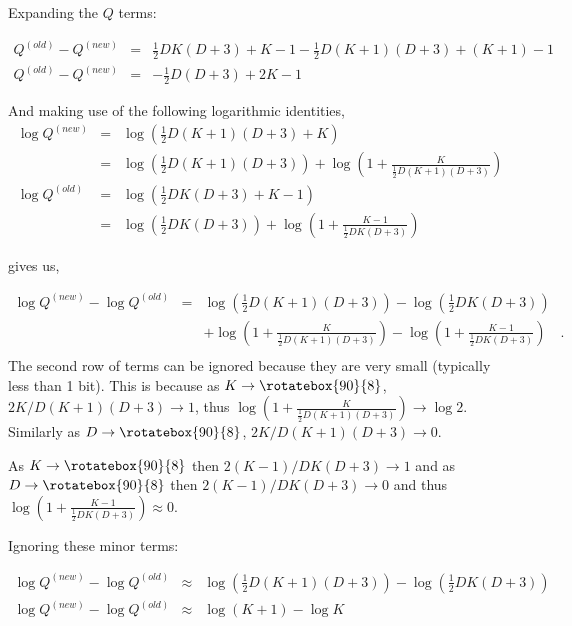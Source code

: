 \documentclass{elsarticle}
\def\infinity{\rotatebox{90}{8}}
\begin{document}
Expanding the $Q$ terms:

\begin{eqnarray}
Q^{(old)} - Q^{(new)} &=& \frac{1}{2}DK(D + 3) + K - 1 - \frac{1}{2}D(K + 1)(D + 3) + (K + 1) - 1 \nonumber \\
Q^{(old)} - Q^{(new)} &=& -\frac{1}{2}D(D+3) + 2K  - 1
\label{eq:14}
\end{eqnarray}

\noindent{}And making use of the following logarithmic identities,
\begin{eqnarray}
  \log{Q^{(new)}} &=& \log{\left(\frac{1}{2}D(K+1)(D + 3) + K\right)} \nonumber \\
                  &=& \log{\left(\frac{1}{2}D(K+1)(D + 3)\right)} + \log{\left(1 + \frac{K}{\frac{1}{2}D(K+1)(D + 3)}\right)} \\
  \log{Q^{(old)}} &=& \log{\left(\frac{1}{2}DK(D + 3) + K - 1\right)} \nonumber \\
                  &=& \log{\left(\frac{1}{2}DK(D + 3)\right)} + \log{\left(1 + \frac{K - 1}{\frac{1}{2}DK(D + 3)}\right)}
\end{eqnarray}


\noindent{}gives us,

\begin{eqnarray}
  \log{Q^{(new)}} - \log{Q^{(old)}} &=& \log{\left(\frac{1}{2}D(K+1)(D + 3)\right)} - \log{\left(\frac{1}{2}DK(D + 3)\right)} \nonumber \\
                                    &&+ \log{\left(1 + \frac{K}{\frac{1}{2}D(K+1)(D + 3)}\right)} - \log{\left(1 + \frac{K - 1}{\frac{1}{2}DK(D + 3)}\right)} \quad .\\
\end{eqnarray}
The second row of terms can be ignored because they are very small (typically less than 1 bit). This is because as $K \rightarrow \infinity$, $2K/D(K+1)(D+3) \rightarrow 1$, thus $\log{\left(1 + \frac{K}{\frac{1}{2}D(K+1)(D + 3)}\right)} \rightarrow \log{2}$. Similarly as $D \rightarrow \infinity$, $2K/D(K+1)(D+3) \rightarrow 0$.

As $K \rightarrow \infinity$ then $2(K-1)/DK(D+3) \rightarrow 1$ and as $D \rightarrow \infinity$ then $2(K-1)/DK(D+3) \rightarrow 0$ and thus $\log{\left(1 + \frac{K - 1}{\frac{1}{2}DK(D + 3)}\right)} \approx 0$.

\noindent{}Ignoring these minor terms:

\begin{eqnarray}
  \log{Q^{(new)}} - \log{Q^{(old)}} &\approx& \log{\left(\frac{1}{2}D(K+1)(D + 3)\right)} - \log{\left(\frac{1}{2}DK(D + 3)\right)} \nonumber \\
  \log{Q^{(new)}} - \log{Q^{(old)}} &\approx& \log{(K + 1)} - \log{K}
  \label{eq:19}
\end{eqnarray}
\end{document}
